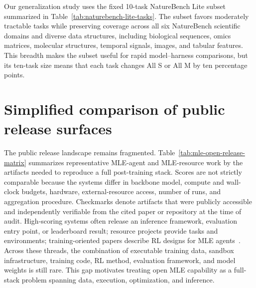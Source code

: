 Our generalization study uses the fixed 10-task NatureBench Lite subset summarized in Table~\ref{tab:naturebench-lite-tasks}.
The subset favors moderately tractable tasks while preserving coverage across all six NatureBench scientific domains and diverse data structures, including biological sequences, omics matrices, molecular structures, temporal signals, images, and tabular features.
This breadth makes the subset useful for rapid model--harness comparisons, but its ten-task size means that each task changes All S or All M by ten percentage points.

\section{Simplified comparison of public release surfaces}

The public release landscape remains fragmented. Table~\ref{tab:mle-open-release-matrix} summarizes representative MLE-agent and MLE-resource work by the artifacts needed to reproduce a full post-training stack. Scores are not strictly comparable because the systems differ in backbone
model, compute and wall-clock budgets, hardware, external-resource access,
number of runs, and aggregation procedure. Checkmarks denote artifacts that
were publicly accessible and independently verifiable from the cited paper or
repository at the time of audit. High-scoring systems often release an inference framework, evaluation entry point, or leaderboard result; resource projects provide tasks and environments; training-oriented papers describe RL designs for MLE agents~\citep{qiang2025mlesmith,liu2025mlagent,li2025mlerl,yang2025rlmleagents,cai2026acegrpo}. Across these threads, the combination of executable training data, sandbox infrastructure, training code, RL method, evaluation framework, and model weights is still rare. This gap motivates treating open MLE capability as a full-stack problem spanning data, execution, optimization, and inference.

